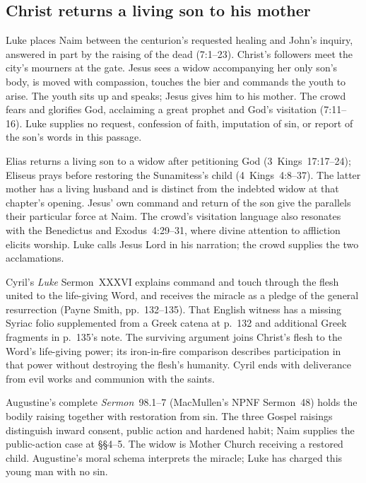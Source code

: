 \subsection*{Christ returns a living son to his mother\enspace{}}

Luke places Naim between the centurion's requested healing and John's
inquiry, answered in part by the raising of the dead (7:1--23).
Christ's followers meet the city's mourners at the gate. Jesus sees a
widow accompanying her only son's body, is moved with compassion, touches
the bier and commands the youth to arise. The youth sits up and speaks;
Jesus gives him to his mother. The crowd fears and glorifies God,
acclaiming a great prophet and God's visitation (7:11--16). Luke supplies
no request, confession of faith, imputation of sin, or report of the son's
words in this passage.

Elias returns a living son to a widow after petitioning God
(3~Kings~17:17--24); Eliseus prays before restoring the Sunamitess's child
(4~Kings~4:8--37). The latter mother has a living husband and is distinct
from the indebted widow at that chapter's opening. Jesus' own command and
return of the son give the parallels their particular force at Naim.
The crowd's visitation language also resonates with the Benedictus and
Exodus~4:29--31, where divine attention to affliction elicits worship.
Luke calls Jesus Lord in his narration; the crowd supplies the two
acclamations.

Cyril's \emph{Luke} Sermon~XXXVI explains command and touch through the
flesh united to the life-giving Word, and receives the miracle as a pledge
of the general resurrection (Payne Smith, pp.~132--135). That English
witness has a missing Syriac folio supplemented from a Greek catena at
p.~132 and additional Greek fragments in p.~135's note. The surviving
argument joins Christ's flesh to the Word's life-giving power; its
iron-in-fire comparison describes participation in that power without
destroying the flesh's humanity. Cyril ends with deliverance from evil
works and communion with the saints.

Augustine's complete \emph{Sermon}~98.1--7 (MacMullen's NPNF
Sermon~48) holds the bodily raising together with restoration from sin.
The three Gospel raisings distinguish inward consent, public action and
hardened habit; Naim supplies the public-action case at §§4--5.
The widow is Mother Church receiving a restored child. Augustine's moral
schema interprets the miracle; Luke has charged this young man with no
sin.

